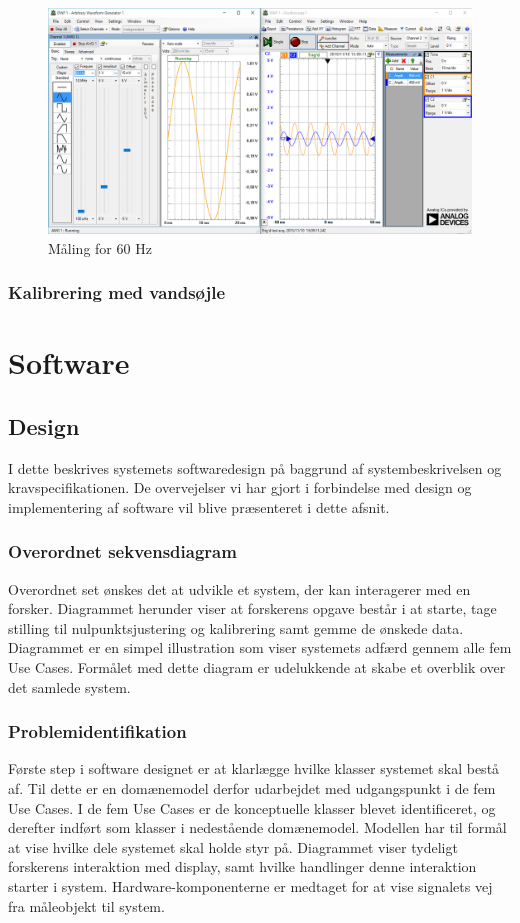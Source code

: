 \begin{figure}[htb]
	\centering
	\includegraphics[width=1.0\textwidth]{Figurer/60Hz}
	\caption{Måling for 60 Hz}
	\label{fig:maeling60Hz}
\end{figure}

\subsubsection{Kalibrering med vandsøjle}




\section{Software}
\subsection{Design}
I dette beskrives systemets softwaredesign på baggrund af systembeskrivelsen og kravspecifikationen. De overvejelser vi har gjort i forbindelse med design og implementering af software vil blive præsenteret i dette afsnit. 

\subsubsection{Overordnet sekvensdiagram}
Overordnet set ønskes det at udvikle et system, der kan interagerer med en forsker. Diagrammet herunder viser at forskerens opgave består i at starte, tage stilling til nulpunktsjustering og kalibrering samt gemme de ønskede data. Diagrammet er en simpel illustration som viser systemets adfærd gennem alle fem Use Cases. Formålet med dette diagram er udelukkende at skabe et overblik over det samlede system.

\subsubsection{Problemidentifikation}
Første step i software designet er at klarlægge hvilke klasser systemet skal bestå af. Til dette er en domænemodel derfor udarbejdet med udgangspunkt i de fem Use Cases. I de fem Use Cases er de konceptuelle klasser blevet identificeret, og derefter indført som klasser i nedestående domænemodel. Modellen har til formål at vise hvilke dele systemet skal holde styr på. 
Diagrammet viser tydeligt forskerens interaktion med display, samt hvilke handlinger denne interaktion starter i system. Hardware-komponenterne er medtaget for at vise signalets vej fra måleobjekt til system. 

